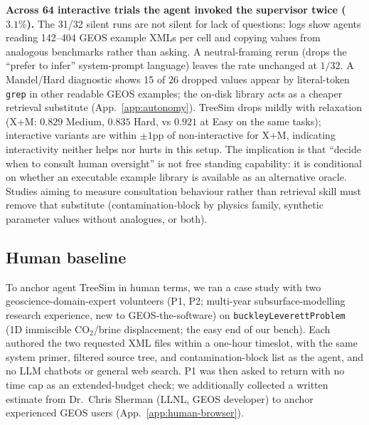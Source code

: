 \documentclass{article}
\begin{document}
\textbf{Across 64 interactive trials the agent invoked the supervisor twice ($3.1\%$).} The 31/32 silent runs are not silent for lack of questions: logs show agents reading 142--404 GEOS example XMLs per cell and copying values from analogous benchmarks rather than asking. A neutral-framing rerun (drops the ``prefer to infer'' system-prompt language) leaves the rate unchanged at $1/32$. A Mandel/Hard diagnostic shows 15 of 26 dropped values appear by literal-token \texttt{grep} in other readable GEOS examples; the on-disk library acts as a cheaper retrieval substitute (App.~\ref{app:autonomy}). TreeSim drops mildly with relaxation (X+M: $0.829$ Medium, $0.835$ Hard, vs $0.921$ at Easy on the same tasks); interactive variants are within $\pm 1$pp of non-interactive for X+M, indicating interactivity neither helps nor hurts in this setup. The implication is that ``decide when to consult human oversight'' is not free standing capability: it is conditional on whether an executable example library is available as an alternative oracle. Studies aiming to measure consultation behaviour rather than retrieval skill must remove that substitute (contamination-block by physics family, synthetic parameter values without analogues, or both).

\subsection{Human baseline}
\label{subsec:human-baseline}

To anchor agent TreeSim in human terms, we ran a case study with two geoscience-domain-expert volunteers (P1, P2; multi-year subsurface-modelling research experience, new to GEOS-the-software) on \texttt{buckleyLeverettProblem} (1D immiscible CO$_2$/brine displacement; the easy end of our bench). Each authored the two requested XML files within a one-hour timeslot, with the same system primer, filtered source tree, and contamination-block list as the agent, and no LLM chatbots or general web search. P1 was then asked to return with no time cap as an extended-budget check; we additionally collected a written estimate from Dr.~Chris Sherman (LLNL, GEOS developer) to anchor experienced GEOS users (App.~\ref{app:human-browser}).
\end{document}
